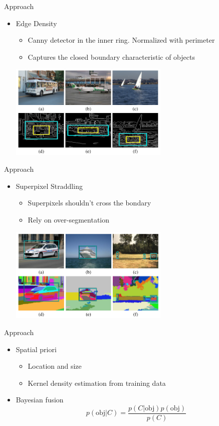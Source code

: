 \documentclass[12pt]{beamer}
\begin{document}
\begin{frame}{Approach}
    \begin{itemize}
        \item Edge Density
        \begin{itemize}
            \item Canny detector in the inner ring. Normalized with perimeter
            \item Captures the closed boundary characteristic of objects
        \end{itemize}
        \medskip
        { \includegraphics[width=0.6\textwidth]{fig4.png} } 
    \end{itemize}
\end{frame}

\begin{frame}{Approach}
    \begin{itemize}
        \item Superpixel Straddling
        \begin{itemize}
            \item Superpixels shouldn't cross the bondary
            \item Rely on over-segmentation
        \end{itemize}
        \medskip
        { \includegraphics[width=0.6\textwidth]{fig6.png} } 
    \end{itemize}
\end{frame}

\begin{frame}{Approach}
    \begin{itemize}
        \item Spatial priori
        \begin{itemize}
            \item Location and size
            \item Kernel density estimation from training data
        \end{itemize}
        \item Bayesian fusion
        \[p(\text{obj}|C) = \frac{p(C|\text{obj})p(\text{obj})}{p(C)}\]
    \end{itemize}
\end{frame}
\end{document}
